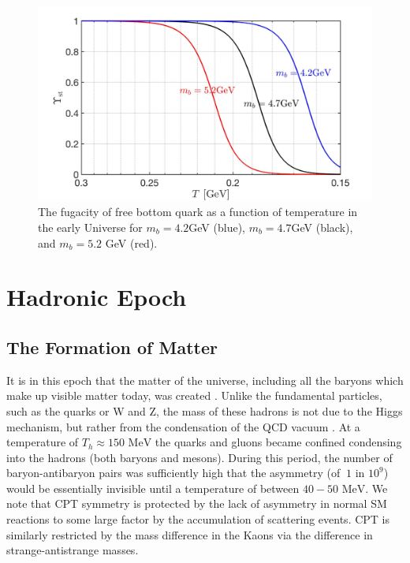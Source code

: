 \documentclass[universe,article,submit,moreauthors,pdftex,a4paper]{Definitions/mdpi}
\newcommand{\MeV}{\text{ MeV}}
\begin{document}
\begin{figure} %
\centering
\includegraphics[width=\linewidth]{BquarkFugacity_tot.jpg}
\caption{The fugacity of free bottom quark as a function of temperature in the early Universe for $m_b = 4.2$GeV (blue), $m_b = 4.7 $GeV (black), and $m_b = 5.2$ GeV (red). }
\label{UpsilonBottom_fig}
\end{figure}


\section{Hadronic Epoch}\label{sec:Hadrons}
\subsection{The Formation of Matter}\label{sec:Creation}
\noindent It is in this epoch that the matter of the universe, including all the baryons which make up visible matter today, was created \cite{Rafelski:2019twp}. Unlike the fundamental particles, such as the quarks or W and Z, the mass of these hadrons is not due to the Higgs mechanism, but rather from the condensation of the QCD vacuum \cite{Roberts:2021xnz,Roberts:2022rxm}. At a temperature of $T_{h}\approx150\MeV$ the quarks and gluons became confined condensing into the hadrons (both baryons and mesons). During this period, the number of baryon-antibaryon pairs was sufficiently high that the asymmetry (of $~1$ in $10^{9}$) would be essentially invisible until a temperature of between $40-50\MeV$. We note that CPT symmetry is protected by the lack of asymmetry in normal SM reactions to some large factor by the accumulation of scattering events. CPT is similarly restricted by the mass difference in the Kaons via the difference in strange-antistrange masses.
\end{document}
